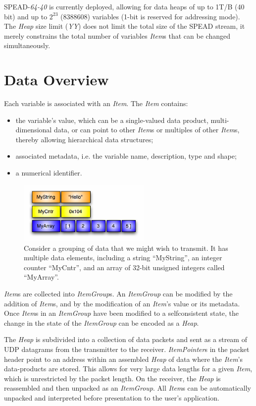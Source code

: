 \documentclass[11pt,english,twoside]{article}
\begin{document}
SPEAD-\emph{64-40} is currently deployed, allowing for data heaps of up to 1T/B (40 bit) and up to $2^{23}$ (8388608) variables (1-bit is
reserved for addressing mode).  The \emph{Heap} size limit (\emph{YY}) does not limit the total size of the SPEAD stream, it merely constrains
the total number of variables \emph{Item}s that can be changed simultaneously.


\section{Data Overview}

Each variable is associated with an \emph{Item}. The \emph{Item} contains:
\begin{itemize}
\item the variable's value, which can be a single-valued data product, multi-dimensional data, or can point to other \emph{Item}s or multiples
of other \emph{Item}s, thereby allowing hierarchical data structures;
\item associated metadata, i.e. the variable name, description, type and shape;
\item a numerical identifier.
\end{itemize}

\begin{figure}[!htb]
\centering
\includegraphics[height=3cm]{images/user_defined_spead_items}
\caption[Example transmit data]{\label{fig:items}\small Consider a grouping of data that we might wish to transmit. It has multiple data
elements, including a string ``MyString'', an integer counter ``MyCntr'', and an array of 32-bit unsigned integers called ``MyArray''.}
\end{figure}

\emph{Item}s are collected into \emph{ItemGroup}s. An \emph{ItemGroup} can be modified by the addition of \emph{Item}s, and by the modification
of an \emph{Item}'s value or its metadata. Once \emph{Item}s in an \emph{ItemGroup} have been modified to a selfconsistent state, the change in
the state of the \emph{ItemGroup} can be encoded as a \emph{Heap}.

The \emph{Heap} is subdivided into a collection of data packets and sent as a stream of UDP datagrams from the transmitter to the receiver.
\emph{ItemPointer}s in the packet header point to an address within an assembled \emph{Heap} of data where the \emph{Item}'s data-products are
stored. This allows for very large data lengths for a given \emph{Item}, which is unrestricted by the packet length. On the receiver, the
\emph{Heap} is reassembled and then unpacked as an \emph{ItemGroup}. All \emph{Item}s can be automatically unpacked and interpreted before
presentation to the user's application.
\end{document}
